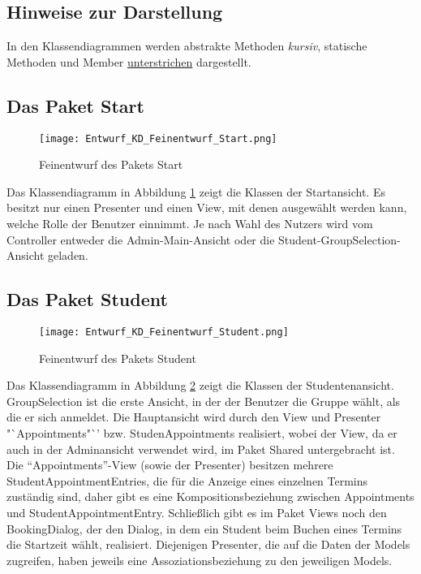 \subsection{Hinweise zur Darstellung}
In den Klassendiagrammen werden abstrakte Methoden \textit{kursiv}, statische Methoden und Member \underline{unterstrichen} dargestellt.

 \subsection{Das Paket Start}
 \begin{figure}
  \texttt{[image: Entwurf\_KD\_Feinentwurf\_Start.png]}
  \label{fig:Klassendiagramm_Start}
  \caption{Feinentwurf des Pakets Start}
 \end{figure}

 Das Klassendiagramm in Abbildung \ref{fig:Klassendiagramm_Start} zeigt die Klassen der Startansicht. Es besitzt nur einen Presenter und einen View, mit denen ausgewählt werden kann, welche Rolle der Benutzer einnimmt. Je nach Wahl des Nutzers wird vom Controller entweder die Admin-Main-Ansicht oder die Student-GroupSelection-Ansicht geladen.

 \subsection{Das Paket Student}
 \begin{figure}
    \texttt{[image: Entwurf\_KD\_Feinentwurf\_Student.png]}
    \label{fig:Klassendiagramm_Student}
    \caption{Feinentwurf des Pakets Student}
 \end{figure}

Das Klassendiagramm in Abbildung \ref{fig:Klassendiagramm_Student} zeigt die Klassen der Studentenansicht.
GroupSelection ist die erste Ansicht, in der der Benutzer die Gruppe wählt, als die er sich anmeldet.
Die Hauptansicht wird durch den View und Presenter "`Appointments"`' bzw. StudenAppointments realisiert, wobei der View, da er auch in der Adminansicht verwendet wird, im Paket Shared untergebracht ist.
Die "`Appointments"'-View (sowie der Presenter) besitzen mehrere StudentAppointmentEntries, die für die Anzeige eines einzelnen Termins zuständig sind, daher gibt es eine Kompositionsbeziehung zwischen Appointments und StudentAppointmentEntry.
Schließlich gibt es im Paket Views noch den BookingDialog, der den Dialog, in dem ein Student beim Buchen eines Termins die Startzeit wählt, realisiert.
Diejenigen Presenter, die auf die Daten der Models zugreifen, haben jeweils eine Assoziationsbeziehung zu den jeweiligen Models.

